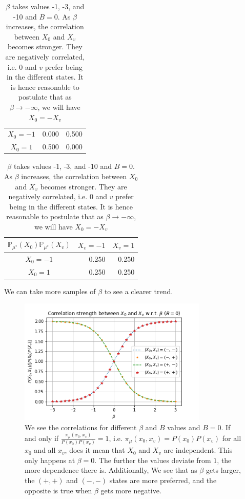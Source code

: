 \documentclass[12pt]{article}
\numberwithin{equation}{section}
\begin{document}
\begin{table}[h]
\begin{tabular}{c|rr}
        $X_0=-1$                       & 0.000                        & 0.500                       \\
        $X_0=1$                        & 0.500                        & 0.000
    \end{tabular}
    \quad\quad
    \begin{tabular}{c|rr}
        $\mathbb{P}_{\mu^*}(X_0)\mathbb{P}_{\mu^*}(X_v)$ & \multicolumn{1}{c}{$X_v=-1$} & \multicolumn{1}{c}{$X_v=1$} \\ \hline
        $X_0=-1$                                         & 0.250                        & 0.250                       \\
        $X_0=1$                                          & 0.250                        & 0.250
    \end{tabular}
    \caption{$\beta$ takes values -1, -3, and -10 and $B=0$. As $\beta$ increases, the correlation between $X_0$ and $X_v$ becomes stronger.  They are negatively correlated, i.e. $0$ and $v$ prefer being in the different states. It is hence reasonable to postulate that as $\beta\rightarrow-\infty$, we will have $X_0=-X_v$}
    \label{Tab. beta-neg-B0}
\end{table}

\newpage

We can take more samples of $\beta$ to see a clearer trend.
\begin{figure}[h]
    \centering
    \includegraphics[width=9cm]{img/ising_x0_xv.png}
    \caption{
        We see the correlations for different $\beta$ and $B$ values and $B=0$.
        If and only if $\frac{\pi_{\mu}(x_0, x_v)}{P(x_0)P(x_v)}=1$,
        i.e. $\pi_{\mu}(x_0, x_v) = P(x_0)P(x_v)$ for all $x_0$ and all $x_v$,
        does it mean that $X_0$ and $X_v$ are independent. This only happens at $\beta=0$. The further the values deviate from $1$,
        the more dependence there is. Additionally, We see that as $\beta$ gets
        larger, the $(+, +)$ and $(-, -)$ states are more preferred, and the opposite is true when $\beta$ gets more negative.}
    \label{Fig. x0-xv-correlation}
\end{figure}
\end{document}
